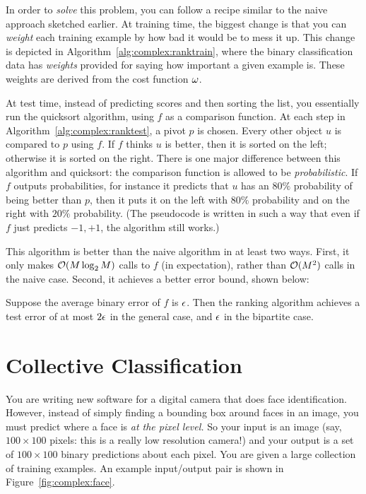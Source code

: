 In order to \emph{solve} this problem, you can follow a recipe similar
to the naive approach sketched earlier.  At training time, the biggest
change is that you can \emph{weight} each training example by how bad
it would be to mess it up.  This change is depicted in
Algorithm~\ref{alg:complex:ranktrain}, where the binary classification
data has \emph{weights}  provided for saying how important a
given example is.  These weights are derived from the cost function
$\omega$.

At test time, instead of predicting scores and then sorting the list,
you essentially run the quicksort algorithm, using $f$ as a comparison
function.  At each step in Algorithm~\ref{alg:complex:ranktest}, a
pivot $p$ is chosen.  Every other object $u$ is compared to $p$ using
$f$.  If $f$ thinks $u$ is better, then it is sorted on the left;
otherwise it is sorted on the right.  There is one major difference
between this algorithm and quicksort: the comparison function is
allowed to be \emph{probabilistic}.  If $f$ outputs probabilities, for
instance it predicts that $u$ has an $80\%$ probability of being
better than $p$, then it puts it on the left with $80\%$ probability
and on the right with $20\%$ probability.  (The pseudocode is written
in such a way that even if $f$ just predicts $-1,+1$, the algorithm
still works.)

This algorithm is better than the naive algorithm in at least two
ways.  First, it only makes $\mathcal{O}(M\log_2 M)$ calls to $f$ (in
expectation), rather than $\mathcal{O}(M^2)$ calls in the naive case.  Second,
it achieves a better error bound, shown below:

\begin{theorem} \label{thm:complex:rank} Suppose the
  average binary error of $f$ is $\epsilon$.  Then the ranking algorithm
  achieves a test error of at most $2\epsilon$ in the general case, and
  $\epsilon$ in the bipartite case.
\end{theorem}




\section{Collective Classification}


You are writing new software for a digital camera that does face
identification.  However, instead of simply finding a bounding box
around faces in an image, you must predict where a face is \emph{at
  the pixel level.}  So your input is an image (say, $100\times 100$
pixels: this is a really low resolution camera!) and your output is a
set of $100\times 100$ binary predictions about each pixel.  You are
given a large collection of training examples.  An example
input/output pair is shown in Figure~\ref{fig:complex:face}.

